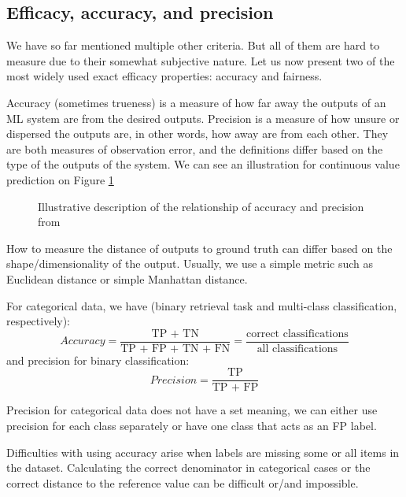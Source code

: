 \subsection*{Efficacy, accuracy, and precision}
We have so far mentioned multiple other criteria. But all of them are hard to measure due to their somewhat subjective nature. Let us now present two of the most widely used exact efficacy properties: accuracy and fairness.

Accuracy (sometimes trueness) is a measure of how far away the outputs of an ML system are from the desired outputs. Precision is a measure of how unsure or dispersed the outputs are, in other words, how away are from each other. They are both measures of observation error, and the definitions differ based on the type of the outputs of the system. We can see an illustration for continuous value prediction on Figure \ref{fig:accuracy_fairness}

\begin{figure}[htbp]
    \centering
    
    \caption{Illustrative description of the relationship of accuracy and precision from \cite{Accuracy_precision}}
    \label{fig:accuracy_fairness}
\end{figure}

How to measure the distance of outputs to ground truth can differ based on the shape/dimensionality of the output. Usually, we use a simple metric such as Euclidean distance or simple Manhattan distance.


For categorical data, we have (binary retrieval task and multi-class classification, respectively):
\begin{equation}
    Accuracy = \dfrac{\text{TP + TN}}{\text{TP + FP + TN + FN}} = \dfrac{\text{correct classifications}}{\text{all classifications}}
\end{equation}
and precision for binary classification:
\begin{equation}
    Precision = \dfrac{\text{TP}}{\text{TP + FP}}
\end{equation}

Precision for categorical data does not have a set meaning, we can either use precision for each class separately or have one class that acts as an FP label.

Difficulties with using accuracy arise when labels are missing some or all items in the dataset. Calculating the correct denominator in categorical cases or the correct distance to the reference value can be difficult or/and impossible.

